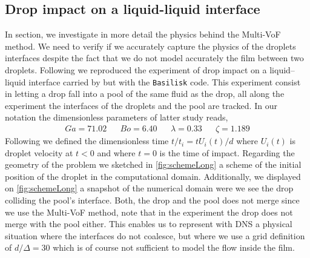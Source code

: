 \subsection*{Drop impact on a liquid-liquid interface}

In section, we investigate in more detail the physics behind the Multi-VoF method. 
We need to verify if we accurately capture the physics of the droplets interfaces despite the fact that we do not model accurately  the film between two droplets. 
Following \citet{balcazar2015multiple} we reproduced the experiment of drop impact on a liquid–liquid interface carried by \citet{mohamed2003drop} but with the \texttt{Basilisk} code. 
This experiment consist in letting a drop fall into a pool of the same fluid as the drop, all along the experiment the interfaces of the droplets and the pool are tracked. 
In our notation the dimensionless parameters of latter study reads, 
\begin{align*}
    Ga = 71.02 
    && Bo = 6.40
    && \lambda = 0.33
    && \zeta = 1.189
\end{align*}
Following \citet{mohamed2003drop} we defined the dimensionless time $t / t_i = t U_i(t) /d$ where $U_i(t)$ is droplet velocity at $t<0$ and where $t=0$ is the time of impact. 
Regarding the geometry of the problem we sketched in \ref{fig:schemeLong} a scheme of the initial position of the droplet in the computational domain.
Additionally, we displayed on \ref{fig:schemeLong} a snapshot of the numerical domain were we see the drop colliding the pool's interface.
Both, the drop and the pool does not merge since we use the Multi-VoF method, note that in the experiment the drop does not merge with the pool either.
This enables us to represent with DNS a physical situation where the interfaces do not coalesce, but where we use a grid definition of $d/\Delta = 30$ which is of course not sufficient to model the flow inside the film. 
